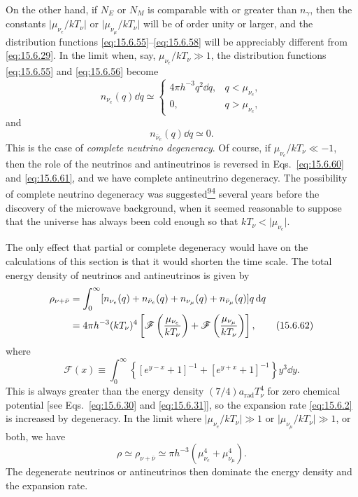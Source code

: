 On the other hand, if \(N_E\) or \(N_M\) is comparable with or greater than
\(n_\gamma\), then the constants
\(\lvert\mu_{\nu_e}/kT_\nu\rvert\) or
\(\lvert\mu_{\nu_\mu}/kT_\nu\rvert\) will be of order unity or larger, and
the distribution functions \eqref{eq:15.6.55}--\eqref{eq:15.6.58} will be
appreciably different from \eqref{eq:15.6.29}. In the limit when, say,
\(\mu_{\nu_e}/kT_\nu\gg1\), the distribution functions
\eqref{eq:15.6.55} and \eqref{eq:15.6.56} become
\begin{equation}
  n_{\nu_e}(q)\dd q
  \simeq
  \begin{cases}
    4\pi h^{-3}q^2\dd q, & q<\mu_{\nu_e},\\
    0, & q>\mu_{\nu_e},
  \end{cases}
  \tag{15.6.60}\label{eq:15.6.60}
\end{equation}
and
\begin{equation}
  n_{\bar\nu_e}(q)\dd q\simeq0.
  \tag{15.6.61}\label{eq:15.6.61}
\end{equation}
This is the case of \emph{complete neutrino degeneracy}. Of course, if
\(\mu_{\nu_e}/kT_\nu\ll-1\), then the role of the neutrinos and antineutrinos
is reversed in Eqs.~\eqref{eq:15.6.60} and \eqref{eq:15.6.61}, and we have
complete antineutrino degeneracy. The possibility of complete neutrino
degeneracy was suggested\hyperref[ch15-ref-94]{\textsuperscript{94}} several
years before the discovery of the microwave background, when it seemed
reasonable to suppose that the universe has always been cold enough so that
\(kT_\nu<\lvert\mu_{\nu_e}\rvert\).

The only effect that partial or complete degeneracy would have on the
calculations of this section is that it would shorten the time scale. The total
energy density of neutrinos and antineutrinos is given by
\begin{align}
  \rho_{\nu+\bar\nu}
  &=
  \int_0^\infty
  [n_{\nu_e}(q)+n_{\bar\nu_e}(q)
  +n_{\nu_\mu}(q)+n_{\bar\nu_\mu}(q)]q\mathop{}\!\mathrm{d} q
  \notag\\
  &=
  4\pi h^{-3}(kT_\nu)^4
  \left[
    \mathscr F\left(\frac{\mu_{\nu_e}}{kT_\nu}\right)
    +
    \mathscr F\left(\frac{\mu_{\nu_\mu}}{kT_\nu}\right)
  \right],
  \tag{15.6.62}\label{eq:15.6.62}
\end{align}
where
\[
  \mathscr F(x)
  \equiv
  \int_0^\infty
  \left\{
    [e^{y-x}+1]^{-1}
    +
    [e^{y+x}+1]^{-1}
  \right\}y^3\dd y.
\]
This is always greater than the energy density
\((7/4)a_{\mathrm{rad}}T_\nu^4\) for zero chemical potential [see
Eqs.~\eqref{eq:15.6.30} and \eqref{eq:15.6.31}], so the expansion rate
\eqref{eq:15.6.2} is increased by degeneracy. In the limit where
\(\lvert\mu_{\nu_e}/kT_\nu\rvert\gg1\) or
\(\lvert\mu_{\nu_\mu}/kT_\nu\rvert\gg1\), or both, we have
\begin{equation}
  \rho
  \simeq
  \rho_{\nu+\bar\nu}
  \simeq
  \pi h^{-3}
  (\mu_{\nu_e}^4+\mu_{\nu_\mu}^4).
  \tag{15.6.63}\label{eq:15.6.63}
\end{equation}
The degenerate neutrinos or antineutrinos then dominate the energy density and
the expansion rate.

